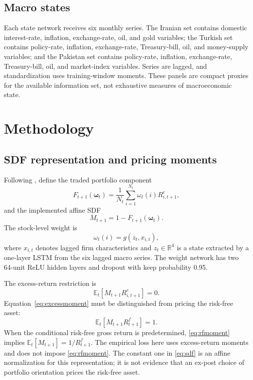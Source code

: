\documentclass[12pt]{article}
\begin{document}
\subsection{Macro states}

Each state network receives six monthly series. The Iranian set contains domestic interest-rate, inflation, exchange-rate, oil, and gold variables; the Turkish set contains policy-rate, inflation, exchange-rate, Treasury-bill, oil, and money-supply variables; and the Pakistan set contains policy-rate, inflation, exchange-rate, Treasury-bill, oil, and market-index variables. Series are lagged, and standardization uses training-window moments. These panels are compact proxies for the available information set, not exhaustive measures of macroeconomic state.

\section{Methodology}\label{sec:method}

\subsection{SDF representation and pricing moments}

Following \citet{cpz2024}, define the traded portfolio component
\begin{equation}
F_{t+1}(\bm\omega_t)
=\frac{1}{N_t}\sum_{i=1}^{N_t}\omega_t(i)R^e_{i,t+1},
\label{eq:factor}
\end{equation}
and the implemented affine SDF
\begin{equation}
M_{t+1}=1-F_{t+1}(\bm\omega_t).
\label{eq:sdf}
\end{equation}
The stock-level weight is
\begin{equation}
\omega_t(i)=g\!\left(z_t,x_{i,t}\right),
\label{eq:omega}
\end{equation}
where $x_{i,t}$ denotes lagged firm characteristics and $z_t\in\mathbb{R}^4$ is a state extracted by a one-layer LSTM from the six lagged macro series. The weight network has two 64-unit ReLU hidden layers and dropout with keep probability 0.95.

The excess-return restriction is
\begin{equation}
\mathbb{E}_t[M_{t+1}R^e_{i,t+1}]=0.
\label{eq:excessmoment}
\end{equation}
Equation~\eqref{eq:excessmoment} must be distinguished from pricing the risk-free asset:
\begin{equation}
\mathbb{E}_t[M_{t+1}R^f_{t+1}]=1.
\label{eq:rfmoment}
\end{equation}
When the conditional risk-free gross return is predetermined, \eqref{eq:rfmoment} implies $\mathbb{E}_t[M_{t+1}]=1/R^f_{t+1}$. The empirical loss here uses excess-return moments and does not impose \eqref{eq:rfmoment}. The constant one in \eqref{eq:sdf} is an affine normalization for this representation; it is not evidence that an ex-post choice of portfolio orientation prices the risk-free asset.
\end{document}
